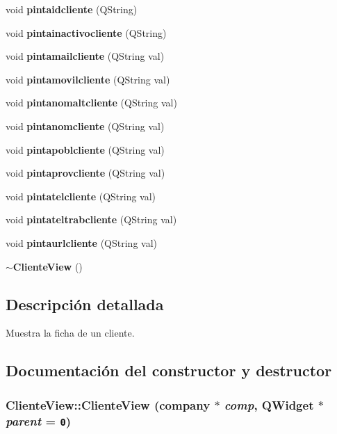 \begin{CompactItemize}
\item 
void {\bf pintaidcliente} (QString)\label{classClienteView_a16}

\item 
void {\bf pintainactivocliente} (QString)\label{classClienteView_a17}

\item 
void {\bf pintamailcliente} (QString val)\label{classClienteView_a18}

\item 
void {\bf pintamovilcliente} (QString val)\label{classClienteView_a19}

\item 
void {\bf pintanomaltcliente} (QString val)\label{classClienteView_a20}

\item 
void {\bf pintanomcliente} (QString val)\label{classClienteView_a21}

\item 
void {\bf pintapoblcliente} (QString val)\label{classClienteView_a22}

\item 
void {\bf pintaprovcliente} (QString val)\label{classClienteView_a23}

\item 
void {\bf pintatelcliente} (QString val)\label{classClienteView_a24}

\item 
void {\bf pintateltrabcliente} (QString val)\label{classClienteView_a25}

\item 
void {\bf pintaurlcliente} (QString val)\label{classClienteView_a26}

\item 
{\bf $\sim$Cliente\-View} ()
\end{CompactItemize}


\subsection{Descripci\'{o}n detallada}
Muestra la ficha de un cliente. 



\subsection{Documentaci\'{o}n del constructor y destructor}
\subsubsection{\setlength{\rightskip}{0pt plus 5cm}Cliente\-View::Cliente\-View ({\bf company} $\ast$ {\em comp}, QWidget $\ast$ {\em parent} = {\tt 0})}\label{classClienteView_a1}


